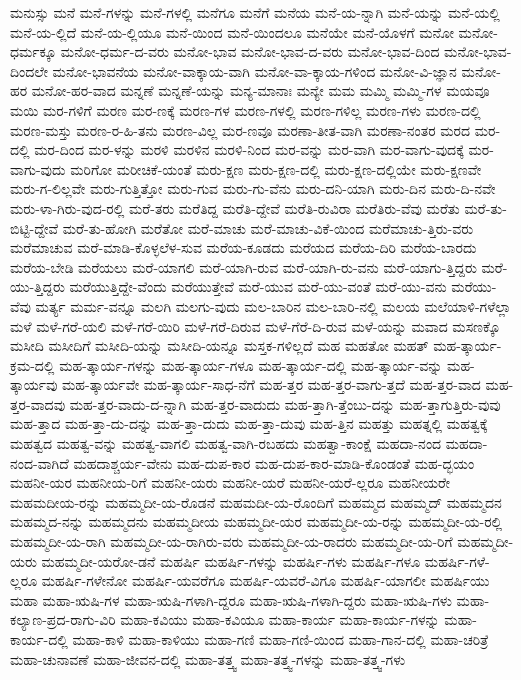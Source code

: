 {ಮನುಸ್ಸು
ಮನೆ
ಮನೆ-ಗಳನ್ನು
ಮನೆ-ಗಳಲ್ಲಿ
ಮನೆಗೂ
ಮನೆಗೆ
ಮನೆಯ
ಮನೆ-ಯ-ನ್ನಾಗಿ
ಮನೆ-ಯನ್ನು
ಮನೆ-ಯಲ್ಲಿ
ಮನೆ-ಯ-ಲ್ಲಿದೆ
ಮನೆ-ಯ-ಲ್ಲಿಯೂ
ಮನೆ-ಯಿಂದ
ಮನೆ-ಯಿಂದಲೂ
ಮನೆಯೇ
ಮನೆ-ಯೊಳಗೆ
ಮನೋ
ಮನೋ-ಧರ್ಮಕ್ಕೂ
ಮನೋ-ಧರ್ಮ-ದ-ವರು
ಮನೋ-ಭಾವ
ಮನೋ-ಭಾವ-ದ-ವರು
ಮನೋ-ಭಾವ-ದಿಂದ
ಮನೋ-ಭಾವ-ದಿಂದಲೇ
ಮನೋ-ಭಾವನೆಯ
ಮನೋ-ವಾಕ್ಕಾಯ-ವಾಗಿ
ಮನೋ-ವಾ-ಕ್ಕಾಯ-ಗಳಿಂದ
ಮನೋ-ವಿ-ಜ್ಞಾನ
ಮನೋ-ಹರ
ಮನೋ-ಹರ-ವಾದ
ಮನ್ನಣೆ
ಮನ್ನಣೆ-ಯನ್ನು
ಮನ್ಯ-ಮಾನಾಃ
ಮನ್ಯೇ
ಮಮ
ಮಮ್ಮಿ
ಮಮ್ಮಿ-ಗಳ
ಮಯವೂ
ಮಯಿ
ಮರ-ಗಳಿಗೆ
ಮರಣ
ಮರ-ಣಕ್ಕೆ
ಮರಣ-ಗಳ
ಮರಣ-ಗಳಲ್ಲಿ
ಮರಣ-ಗಳಿಲ್ಲ
ಮರಣ-ಗಳು
ಮರಣ-ದಲ್ಲಿ
ಮರಣ-ಮಸ್ತು
ಮರಣ-ರ-ಹಿ-ತನು
ಮರಣ-ವಿಲ್ಲ
ಮರ-ಣವೂ
ಮರಣಾ-ತೀತ-ವಾಗಿ
ಮರಣಾ-ನಂತರ
ಮರದ
ಮರ-ದಲ್ಲಿ
ಮರ-ದಿಂದ
ಮರ-ಳನ್ನು
ಮರಳಿ
ಮರಳಿನ
ಮರಳಿ-ನಿಂದ
ಮರ-ವನ್ನು
ಮರ-ವಾಗಿ
ಮರ-ವಾಗು-ವುದಕ್ಕೆ
ಮರ-ವಾಗು-ವುದು
ಮರಿಗೋ
ಮರೀಚಿಕೆ-ಯಂತೆ
ಮರು-ಕ್ಷಣ
ಮರು-ಕ್ಷಣ-ದಲ್ಲಿ
ಮರು-ಕ್ಷಣ-ದಲ್ಲಿಯೇ
ಮರು-ಕ್ಷಣವೇ
ಮರು-ಗ-ಲಿಲ್ಲವೇ
ಮರು-ಗುತ್ತಿತ್ತೋ
ಮರು-ಗುವ
ಮರು-ಗು-ವೆನು
ಮರು-ದನಿ-ಯಾಗಿ
ಮರು-ದಿನ
ಮರು-ದಿ-ನವೇ
ಮರು-ಳಾ-ಗಿರು-ವುದ-ರಲ್ಲಿ
ಮರೆ-ತರು
ಮರೆತಿದ್ದ
ಮರೆತಿ-ದ್ದೇವೆ
ಮರೆತಿ-ರುವಿರಾ
ಮರೆತಿರು-ವೆವು
ಮರೆತು
ಮರೆ-ತು-ಬಿಟ್ಟಿ-ದ್ದೇವೆ
ಮರೆ-ತು-ಹೋಗಿ
ಮರೆತೋ
ಮರೆ-ಮಾಚು
ಮರೆ-ಮಾಚು-ವಿಕೆ-ಯಿಂದ
ಮರೆಮಾಚು-ತ್ತಿರು-ವರು
ಮರೆಮಾಚುವ
ಮರೆ-ಮಾಡಿ-ಕೊಳ್ಳಲೆಳ-ಸುವ
ಮರೆಯ-ಕೂಡದು
ಮರೆಯದ
ಮರೆಯ-ದಿರಿ
ಮರೆಯ-ಬಾರದು
ಮರೆಯ-ಬೇಡಿ
ಮರೆಯಲು
ಮರೆ-ಯಾಗಲಿ
ಮರೆ-ಯಾಗಿ-ರುವ
ಮರೆ-ಯಾಗಿ-ರು-ವನು
ಮರೆ-ಯಾಗು-ತ್ತಿದ್ದರು
ಮರೆ-ಯು-ತ್ತಿದ್ದರು
ಮರೆಯುತ್ತಿದ್ದೇ-ವೆಂದು
ಮರೆಯುತ್ತೇವೆ
ಮರೆ-ಯುವ
ಮರೆ-ಯು-ವಂತೆ
ಮರೆ-ಯು-ವನು
ಮರೆಯು-ವೆವು
ಮರ್ತ್ಯ
ಮರ್ಮ-ವನ್ನೂ
ಮಲಗಿ
ಮಲಗು-ವುದು
ಮಲ-ಬಾರಿನ
ಮಲ-ಬಾರಿ-ನಲ್ಲಿ
ಮಲಯ
ಮಲೆಯಾಳಿ-ಗಳೆಲ್ಲಾ
ಮಳೆ
ಮಳೆ-ಗರೆ-ಯಲಿ
ಮಳೆ-ಗರೆ-ಯಿರಿ
ಮಳೆ-ಗರೆ-ದಿರುವ
ಮಳೆ-ಗೆರೆ-ದಿ-ರುವ
ಮಳೆ-ಯನ್ನು
ಮವಾದ
ಮಸಣಕ್ಕೊ
ಮಸೀದಿ
ಮಸೀದಿಗೆ
ಮಸೀದಿ-ಯನ್ನು
ಮಸೀದಿ-ಯನ್ನೂ
ಮಸ್ತಕ-ಗಳಿಲ್ಲದೆ
ಮಹ
ಮಹತೋ
ಮಹತ್
ಮಹ-ತ್ಕಾರ್ಯ-ಕ್ರಮ-ದಲ್ಲಿ
ಮಹ-ತ್ಕಾರ್ಯ-ಗಳನ್ನು
ಮಹ-ತ್ಕಾರ್ಯ-ಗಳೂ
ಮಹ-ತ್ಕಾರ್ಯ-ದಲ್ಲಿ
ಮಹ-ತ್ಕಾರ್ಯ-ವನ್ನು
ಮಹ-ತ್ಕಾರ್ಯವು
ಮಹ-ತ್ಕಾರ್ಯವೇ
ಮಹ-ತ್ಕಾರ್ಯ-ಸಾಧ-ನೆಗೆ
ಮಹ-ತ್ತರ
ಮಹ-ತ್ತರ-ವಾಗು-ತ್ತದೆ
ಮಹ-ತ್ತರ-ವಾದ
ಮಹ-ತ್ತರ-ವಾದವು
ಮಹ-ತ್ತರ-ವಾದು-ದ-ನ್ನಾಗಿ
ಮಹ-ತ್ತರ-ವಾದುದು
ಮಹ-ತ್ತಾಗಿ-ತ್ತೆಂಬು-ದನ್ನು
ಮಹ-ತ್ತಾಗುತ್ತಿರು-ವುವು
ಮಹ-ತ್ತಾದ
ಮಹ-ತ್ತಾ-ದು-ದನ್ನು
ಮಹ-ತ್ತಾ-ದುದು
ಮಹ-ತ್ತಾ-ದುವು
ಮಹ-ತ್ತಿನ
ಮಹತ್ತು
ಮಹತ್ನಲ್ಲಿ
ಮಹತ್ವಕ್ಕೆ
ಮಹತ್ವದ
ಮಹತ್ವ-ವನ್ನು
ಮಹತ್ವ-ವಾಗಲಿ
ಮಹತ್ವ-ವಾಗಿ-ರಬಹದು
ಮಹತ್ವಾ-ಕಾಂಕ್ಷೆ
ಮಹದಾ-ನಂದ
ಮಹದಾ-ನಂದ-ವಾಗಿದೆ
ಮಹದಾಶ್ಚರ್ಯ-ವೇನು
ಮಹ-ದುಪ-ಕಾರ
ಮಹ-ದುಪ-ಕಾರ-ಮಾಡಿ-ಕೊಂಡಂತೆ
ಮಹ-ದ್ಭಯಂ
ಮಹನೀ-ಯರ
ಮಹನೀಯ-ರಿಗೆ
ಮಹನೀ-ಯರು
ಮಹನೀ-ಯರೆ
ಮಹನೀ-ಯರೆ-ಲ್ಲರೂ
ಮಹನೀಯರೇ
ಮಹಮದೀಯ-ರನ್ನು
ಮಹಮ್ಮದೀ-ಯ-ರೊಡನೆ
ಮಹಮದೀ-ಯ-ರೊಂದಿಗೆ
ಮಹಮ್ಮದ
ಮಹಮ್ಮದ್
ಮಹಮ್ಮದನ
ಮಹಮ್ಮದ-ನನ್ನು
ಮಹಮ್ಮದನು
ಮಹಮ್ಮದೀಯ
ಮಹಮ್ಮದೀ-ಯರ
ಮಹಮ್ಮದೀ-ಯ-ರನ್ನು
ಮಹಮ್ಮದೀ-ಯ-ರಲ್ಲಿ
ಮಹಮ್ಮದೀ-ಯ-ರಾಗಿ
ಮಹಮ್ಮದೀ-ಯ-ರಾಗಿರು-ವರು
ಮಹಮ್ಮದೀ-ಯ-ರಾದರು
ಮಹಮ್ಮದೀ-ಯ-ರಿಗೆ
ಮಹಮ್ಮದೀ-ಯರು
ಮಹಮ್ಮದೀ-ಯರೋ-ಡನೆ
ಮಹರ್ಷಿ
ಮಹರ್ಷಿ-ಗಳನ್ನು
ಮಹರ್ಷಿ-ಗಳು
ಮಹರ್ಷಿ-ಗಳೂ
ಮಹರ್ಷಿ-ಗಳೆ-ಲ್ಲರೂ
ಮಹರ್ಷಿ-ಗಳೇನೋ
ಮಹರ್ಷಿ-ಯವರೆಗೂ
ಮಹರ್ಷಿ-ಯವರೆ-ವಿಗೂ
ಮಹರ್ಷಿ-ಯಾಗಲೀ
ಮಹರ್ಷಿಯು
ಮಹಾ
ಮಹಾ-ಋಷಿ-ಗಳ
ಮಹಾ-ಋಷಿ-ಗಳಾಗಿ-ದ್ದರೂ
ಮಹಾ-ಋಷಿ-ಗಳಾಗಿ-ದ್ದರು
ಮಹಾ-ಋಷಿ-ಗಳು
ಮಹಾ-ಕಲ್ಯಾಣ-ಪ್ರದ-ರಾಗು-ವಿರಿ
ಮಹಾ-ಕವಿಯು
ಮಹಾ-ಕವಿಯೂ
ಮಹಾ-ಕಾರ್ಯ
ಮಹಾ-ಕಾರ್ಯ-ಗಳನ್ನು
ಮಹಾ-ಕಾರ್ಯ-ದಲ್ಲಿ
ಮಹಾ-ಕಾಳಿ
ಮಹಾ-ಕಾಳಿಯು
ಮಹಾ-ಗಣಿ
ಮಹಾ-ಗಣಿ-ಯಿಂದ
ಮಹಾ-ಗಾನ-ದಲ್ಲಿ
ಮಹಾ-ಚರಿತ್ರೆ
ಮಹಾ-ಚುನಾವಣೆ
ಮಹಾ-ಜೀವನ-ದಲ್ಲಿ
ಮಹಾ-ತತ್ತ್ವ
ಮಹಾ-ತತ್ತ್ವ-ಗಳನ್ನು
ಮಹಾ-ತತ್ತ್ವ-ಗಳು
}
